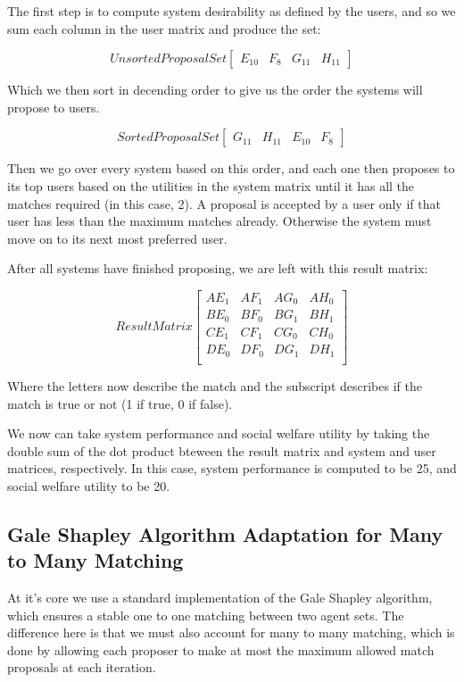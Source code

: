 \documentclass[11pt, letterpaper]{article}
\begin{document}
	The first step is to compute system desirability as defined by the users, and so we sum each column in the user matrix and produce the set:

	\[
	Unsorted Proposal Set
	\begin{bmatrix}
		E_{10} & F_{8} & G_{11} & H_{11}
	\end{bmatrix}
	\]

	Which we then sort in decending order to give us the order the systems will propose to users.

	\[
	Sorted Proposal Set
	\begin{bmatrix}
		G_{11} & H_{11} & E_{10} & F_{8}
	\end{bmatrix}
	\]

	Then we go over every system based on this order, and each one then proposes to its top users based on the utilities in the system matrix until it has all the matches required (in this case, 2).  A proposal is accepted by a user only if that user has less than the maximum matches already.  Otherwise the system must move on to its next most preferred user.

	After all systems have finished proposing, we are left with this result matrix:

	\[
	Result Matrix
	\begin{bmatrix}
		AE_{1} & AF_{1} & AG_{0} & AH_{0} \\
		BE_{0} & BF_{0} & BG_{1} & BH_{1} \\
		CE_{1} & CF_{1} & CG_{0} & CH_{0} \\
		DE_{0} & DF_{0} & DG_{1} & DH_{1} \\
	\end{bmatrix}
	\]

	Where the letters now describe the match and the subscript describes if the match is true or not (1 if true, 0 if false).

	We now can take system performance and social welfare utility by taking the double sum of the dot product bteween the result matrix and system and user matrices, respectively.  In this case, system performance is computed to be 25, and social welfare utility to be 20.  

\subsection{Gale Shapley Algorithm Adaptation for Many to Many Matching}
At it's core we use a standard implementation of the Gale Shapley algorithm, which ensures a stable one to one matching between two agent sets.  The difference here is that we must also account for many to many matching, which is done by allowing each proposer to make at most the maximum allowed match proposals at each iteration. 
\end{document}
